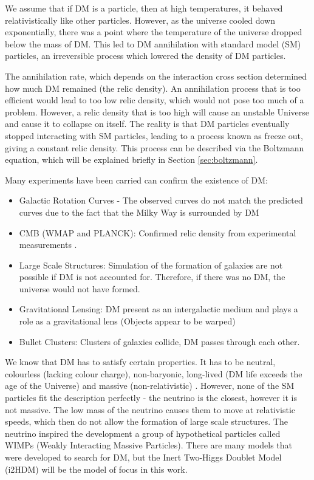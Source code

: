 \documentclass[12pt]{article}
\begin{document}
We assume that if DM is a particle, then at high temperatures, it behaved relativistically like other particles. However, as the universe cooled down exponentially, there was a point where the temperature of the universe dropped below the mass of DM. This led to DM annihilation with standard model (SM) particles, an irreversible process which lowered the density of DM particles. 

The annihilation rate, which depends on the interaction cross section determined how much DM remained (the relic density). An annihilation process that is too efficient would lead to too low relic density, which would not pose too much of a problem. However, a relic density that is too high will cause an unstable Universe and cause it to collapse on itself. The reality is that DM particles eventually stopped interacting with SM particles, leading to a process known as freeze out, giving a constant relic density. This process can be described via the Boltzmann equation, which will be explained briefly in Section \ref{sec:boltzmann}.

Many experiments have been carried can confirm the existence of DM:

\begin{itemize}
    \item Galactic Rotation Curves - The observed curves do not match the predicted curves due to the fact that the Milky Way is surrounded by DM
    \item CMB (WMAP and PLANCK): Confirmed relic density from experimental measurements \cite{Planck:2018vyg}.
    \item Large Scale Structures: Simulation of the formation of galaxies are not possible if DM is not accounted for. Therefore, if there was no DM, the universe would not have formed.
    \item Gravitational Lensing: DM present as an intergalactic medium and plays a role as a gravitational lens (Objects appear to be warped)
    \item Bullet Clusters: Clusters of galaxies collide, DM passes through each other.
\end{itemize}

We know that DM has to satisfy certain properties. It has to be neutral, colourless (lacking colour charge), non-baryonic, long-lived (DM life exceeds the age of the Universe) and massive (non-relativistic) \cite{ZACEK_2007, DeLuca2018, gondolo2004introductionnonbaryonicdarkmatter}. However, none of the SM particles fit the description perfectly - the neutrino is the closest, however it is not massive. The low mass of the neutrino causes them to move at relativistic speeds, which then do not allow the formation of large scale structures. The neutrino inspired the development a group of hypothetical particles called WIMPs (Weakly Interacting Massive Particles). There are many models that were developed to search for DM, but the Inert Two-Higgs Doublet Model (i2HDM) will be the model of focus in this work. 
\end{document}
